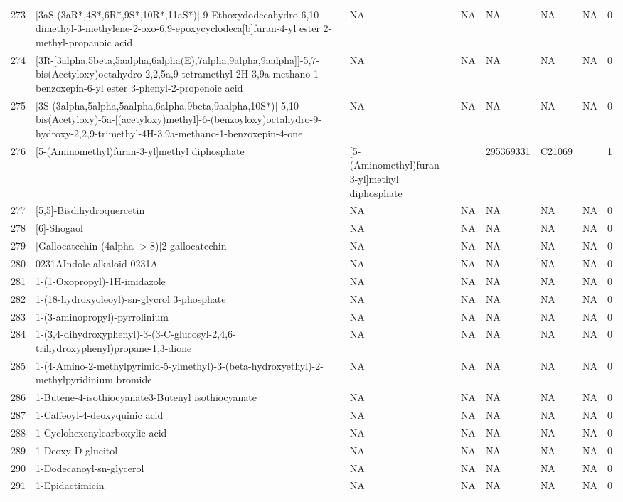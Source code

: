 \documentclass[a4paper]{article}
\begin{document}
\begin{longtable}{rlllllll}
  273 & [3aS-(3aR*,4S*,6R*,9S*,10R*,11aS*)]-9-Ethoxydodecahydro-6,10-dimethyl-3-methylene-2-oxo-6,9-epoxycyclodeca[b]furan-4-yl ester 2-methyl-propanoic acid & NA & NA & NA & NA & NA & 0 \\ 
  274 & [3R-[3alpha,5beta,5aalpha,6alpha(E),7alpha,9alpha,9aalpha]]-5,7-bis(Acetyloxy)octahydro-2,2,5a,9-tetramethyl-2H-3,9a-methano-1-benzoxepin-6-yl ester 3-phenyl-2-propenoic acid & NA & NA & NA & NA & NA & 0 \\ 
  275 & [3S-(3alpha,5alpha,5aalpha,6alpha,9beta,9aalpha,10S*)]-5,10-bis(Acetyloxy)-5a-[(acetyloxy)methyl]-6-(benzoyloxy)octahydro-9-hydroxy-2,2,9-trimethyl-4H-3,9a-methano-1-benzoxepin-4-one & NA & NA & NA & NA & NA & 0 \\ 
  276 & [5-(Aminomethyl)furan-3-yl]methyl diphosphate & [5-(Aminomethyl)furan-3-yl]methyl diphosphate &  & 295369331 & C21069 &  & 1 \\ 
  277 & [5,5]-Bisdihydroquercetin & NA & NA & NA & NA & NA & 0 \\ 
  278 & [6]-Shogaol & NA & NA & NA & NA & NA & 0 \\ 
  279 & [Gallocatechin-(4alpha-$>$8)]2-gallocatechin & NA & NA & NA & NA & NA & 0 \\ 
  280 & 0231AIndole alkaloid 0231A & NA & NA & NA & NA & NA & 0 \\ 
  281 & 1-(1-Oxopropyl)-1H-imidazole & NA & NA & NA & NA & NA & 0 \\ 
  282 & 1-(18-hydroxyoleoyl)-sn-glycrol 3-phosphate & NA & NA & NA & NA & NA & 0 \\ 
  283 & 1-(3-aminopropyl)-pyrrolinium & NA & NA & NA & NA & NA & 0 \\ 
  284 & 1-(3,4-dihydroxyphenyl)-3-(3-C-glucosyl-2,4,6-trihydroxyphenyl)propane-1,3-dione & NA & NA & NA & NA & NA & 0 \\ 
  285 & 1-(4-Amino-2-methylpyrimid-5-ylmethyl)-3-(beta-hydroxyethyl)-2-methylpyridinium bromide & NA & NA & NA & NA & NA & 0 \\ 
  286 & 1-Butene-4-isothiocyanate3-Butenyl isothiocyanate & NA & NA & NA & NA & NA & 0 \\ 
  287 & 1-Caffeoyl-4-deoxyquinic acid & NA & NA & NA & NA & NA & 0 \\ 
  288 & 1-Cyclohexenylcarboxylic acid & NA & NA & NA & NA & NA & 0 \\ 
  289 & 1-Deoxy-D-glucitol & NA & NA & NA & NA & NA & 0 \\ 
  290 & 1-Dodecanoyl-sn-glycerol & NA & NA & NA & NA & NA & 0 \\ 
  291 & 1-Epidactimicin & NA & NA & NA & NA & NA & 0 \\ 

\end{longtable}
\end{document}
